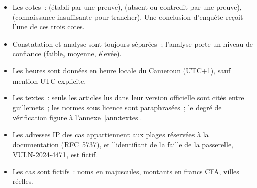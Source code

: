 \begin{itemize}
    \item Les cotes~: \OUI{} (établi par une preuve), \NON{} (absent ou
          contredit par une preuve), \NEK{} (connaissance insuffisante pour
          trancher). Une conclusion d'enquête reçoit l'une de ces trois
          cotes.
    \item Constatation et analyse sont toujours séparées~; l'analyse porte
          un niveau de confiance (faible, moyenne, élevée).
    \item Les heures sont données en heure locale du Cameroun (UTC+1), sauf
          mention UTC explicite.
    \item Les textes~: seuls les articles lus dans leur version officielle
          sont cités entre guillemets~; les normes sous licence sont
          paraphrasées~; le degré de vérification figure à
          l'annexe~\ref{ann:textes}.
    \item Les adresses IP des cas appartiennent aux plages réservées à la
          documentation (RFC~5737), et l'identifiant de la faille de la
          passerelle, VULN-2024-4471, est fictif.
    \item Les cas sont fictifs~: noms en majuscules, montants en francs
          CFA, villes réelles.
\end{itemize}
